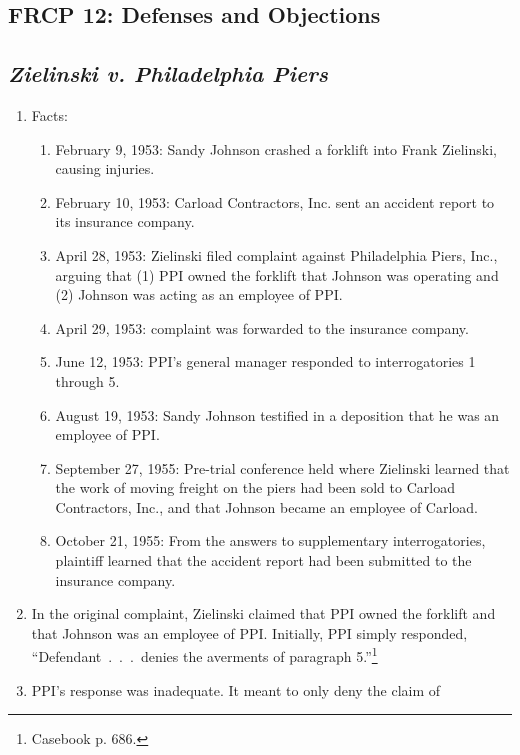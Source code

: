 \subsection{FRCP 12: Defenses and Objections}

\subsection{\emph{Zielinski v. Philadelphia Piers}}

\begin{enumerate}
    \item Facts:
    \begin{enumerate}
        \item February 9, 1953: Sandy Johnson crashed a forklift into Frank 
        Zielinski, causing injuries.
        \item February 10, 1953: Carload Contractors, Inc. sent an accident 
        report to its insurance company.
        \item April 28, 1953: Zielinski filed complaint against Philadelphia 
        Piers, Inc., arguing that (1) PPI owned the forklift that Johnson was 
        operating and (2) Johnson was acting as an employee of PPI.
        \item April 29, 1953: complaint was forwarded to the insurance 
        company.
        \item June 12, 1953: PPI's general manager responded to 
        interrogatories 1 through 5.
        \item August 19, 1953: Sandy Johnson testified in a deposition that he 
        was an employee of PPI.
        \item September 27, 1955: Pre-trial conference held where Zielinski 
        learned that the work of moving freight on the piers had been sold to 
        Carload Contractors, Inc., and that Johnson became an employee of 
        Carload.
        \item October 21, 1955: From the answers to supplementary 
        interrogatories, plaintiff learned that the accident report had been 
        submitted to the insurance company.
    \end{enumerate}
    \item In the original complaint, Zielinski claimed that PPI owned the 
    forklift and that Johnson was an employee of PPI. Initially, PPI simply 
    responded, ``Defendant~.~.~.~denies the averments of paragraph 
    5.''\footnote{Casebook p. 686.}
    \item PPI's response was inadequate. It meant to only deny the claim of 

\end{enumerate}
